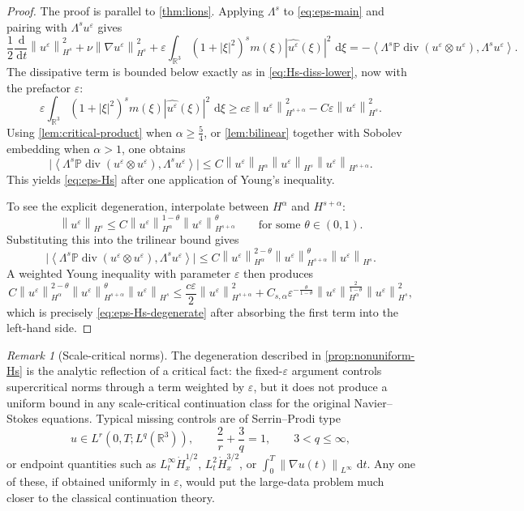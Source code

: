 \documentclass[11pt]{article}
\theoremstyle{definition}
\theoremstyle{remark}
\newtheorem{remark}[theorem]{Remark}
\newcommand{\R}{\mathbb{R}}
\newcommand{\Pcal}{\mathbb{P}}
\newcommand{\dd}{\,\mathrm{d}}
\newcommand{\ip}[2]{\left\langle #1,#2\right\rangle}
\newcommand{\norm}[1]{\left\lVert #1\right\rVert}
\newcommand{\diver}{\operatorname{div}}
\begin{document}
\begin{proof}
The proof is parallel to \cref{thm:lions}. Applying $\Lambda^s$ to \eqref{eq:eps-main} and pairing with $\Lambda^s u^\varepsilon$ gives
\[
\frac12\frac{\dd}{\dd t}\norm{u^\varepsilon}_{H^s}^2
+\nu\norm{\nabla u^\varepsilon}_{H^s}^2
+\varepsilon\int_{\R^3}(1+|\xi|^2)^s m(\xi)|\widehat{u^\varepsilon}(\xi)|^2\,\dd\xi
=-\ip{\Lambda^s\Pcal\diver(u^\varepsilon\otimes u^\varepsilon)}{\Lambda^s u^\varepsilon}.
\]
The dissipative term is bounded below exactly as in \eqref{eq:Hs-diss-lower}, now with the prefactor $\varepsilon$:
\[
\varepsilon\int_{\R^3}(1+|\xi|^2)^s m(\xi)|\widehat{u^\varepsilon}(\xi)|^2\,\dd\xi
\ge c\varepsilon\norm{u^\varepsilon}_{H^{s+\alpha}}^2-C\varepsilon\norm{u^\varepsilon}_{H^s}^2.
\]
Using \cref{lem:critical-product} when $\alpha\ge \frac54$, or \cref{lem:bilinear} together with Sobolev embedding when $\alpha>1$, one obtains
\[
\bigl|\ip{\Lambda^s\Pcal\diver(u^\varepsilon\otimes u^\varepsilon)}{\Lambda^s u^\varepsilon}\bigr|
\le C\norm{u^\varepsilon}_{H^\alpha}\norm{u^\varepsilon}_{H^s}\norm{u^\varepsilon}_{H^{s+\alpha}}.
\]
This yields \eqref{eq:eps-Hs} after one application of Young's inequality.

To see the explicit degeneration, interpolate between $H^\alpha$ and $H^{s+\alpha}$:
\[
\norm{u^\varepsilon}_{H^s}
\le C\norm{u^\varepsilon}_{H^\alpha}^{1-\theta}\norm{u^\varepsilon}_{H^{s+\alpha}}^{\theta}
\qquad\text{for some }\theta\in(0,1).
\]
Substituting this into the trilinear bound gives
\[
\bigl|\ip{\Lambda^s\Pcal\diver(u^\varepsilon\otimes u^\varepsilon)}{\Lambda^s u^\varepsilon}\bigr|
\le C\norm{u^\varepsilon}_{H^\alpha}^{2-\theta}\norm{u^\varepsilon}_{H^{s+\alpha}}^{\theta}\norm{u^\varepsilon}_{H^s}.
\]
A weighted Young inequality with parameter $\varepsilon$ then produces
\[
C\norm{u^\varepsilon}_{H^\alpha}^{2-\theta}\norm{u^\varepsilon}_{H^{s+\alpha}}^{\theta}\norm{u^\varepsilon}_{H^s}
\le \frac{c\varepsilon}{2}\norm{u^\varepsilon}_{H^{s+\alpha}}^2
+ C_{s,\alpha}\varepsilon^{-\frac{\theta}{1-\theta}}\norm{u^\varepsilon}_{H^\alpha}^{\frac{2}{1-\theta}}\norm{u^\varepsilon}_{H^s}^2,
\]
which is precisely \eqref{eq:eps-Hs-degenerate} after absorbing the first term into the left-hand side.
\end{proof}

\begin{remark}[Scale-critical norms]
The degeneration described in \cref{prop:nonuniform-Hs} is the analytic reflection of a critical fact: the fixed-$\varepsilon$ argument controls supercritical norms through a term weighted by $\varepsilon$, but it does not produce a uniform bound in any scale-critical continuation class for the original Navier--Stokes equations. Typical missing controls are of Serrin--Prodi type
\[
u\in L^r(0,T;L^q(\R^3)),\qquad \frac{2}{r}+\frac{3}{q}=1,
\qquad 3<q\le\infty,
\]
or endpoint quantities such as $L^\infty_t\dot H^{1/2}_x$, $L^2_t\dot H^{3/2}_x$, or $\int_0^T\norm{\nabla u(t)}_{L^\infty}\,\dd t$. Any one of these, if obtained uniformly in $\varepsilon$, would put the large-data problem much closer to the classical continuation theory.
\end{remark}
\end{document}
